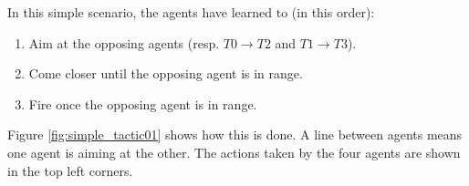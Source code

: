 In this simple scenario, the agents have learned to (in this order):
\begin{enumerate}
    \item Aim at the opposing agents (resp. $T0 \rightarrow T2$ and $T1 \rightarrow T3$).
    \item Come closer until the opposing agent is in range.
    \item Fire once the opposing agent is in range.
\end{enumerate}
Figure \ref{fig:simple_tactic01} shows how this is done. A line between agents means one agent is aiming at the other. The actions taken by the four agents are shown in the top left corners.



